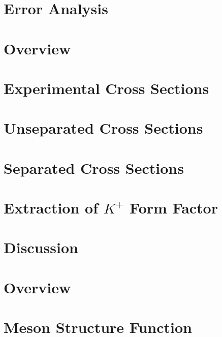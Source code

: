 \documentclass[
]{report}
\begin{document}
\hypertarget{Section-7.5}{%
\section{Error Analysis}\label{Section-7.5}}

\label{Chapter-8}

\hypertarget{Section-8.1}{%
\section{Overview}\label{Section-8.1}}

\hypertarget{Section-8.2}{%
\section{Experimental Cross Sections}\label{Section-8.2}}

\hypertarget{Section-8.3}{%
\section{Unseparated Cross Sections}\label{Section-8.3}}

\hypertarget{Section-8.4}{%
\section{Separated Cross Sections}\label{Section-8.4}}

\hypertarget{Section-8.5}{%
\section{\texorpdfstring{Extraction of \(K^{+}\) Form
Factor}{Extraction of K\^{}\{+\} Form Factor}}\label{Section-8.5}}

\hypertarget{Section-8.6}{%
\section{Discussion}\label{Section-8.6}}

\label{Chapter-9}

\hypertarget{Section-9.1}{%
\section{Overview}\label{Section-9.1}}

\hypertarget{Section-9.2}{%
\section{Meson Structure Function}\label{Section-9.2}}
\end{document}

